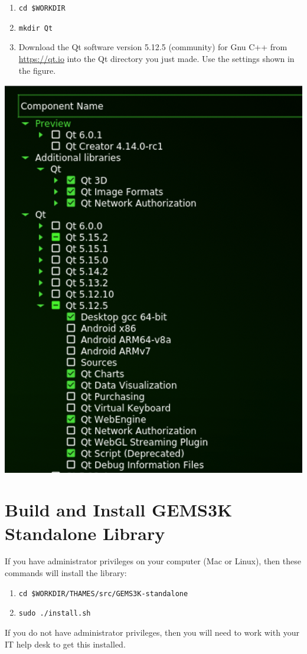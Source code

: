 \documentclass{article}
\begin{document}
\begin{enumerate}
    \item \verb!cd $WORKDIR!
    \item \verb!mkdir Qt!
    \item Download the Qt software version 5.12.5 (community) for Gnu C++ from 
        \href{https://qt.io}{https://qt.io} into the Qt directory you just made.
        Use the settings shown in the figure.
\end{enumerate}

\begin{center}
    \includegraphics[scale=0.4]{Figures/Qt-screen.png}
\end{center}

\section{Build and Install GEMS3K Standalone Library}
If you have administrator privileges on your computer (Mac or Linux), then these commands
will install the library:
\begin{enumerate}
        \item \verb!cd $WORKDIR/THAMES/src/GEMS3K-standalone!
        \item \verb!sudo ./install.sh!
\end{enumerate}
If you do not have administrator privileges, then you will need to work with your IT
help desk to get this installed.
\end{document}
